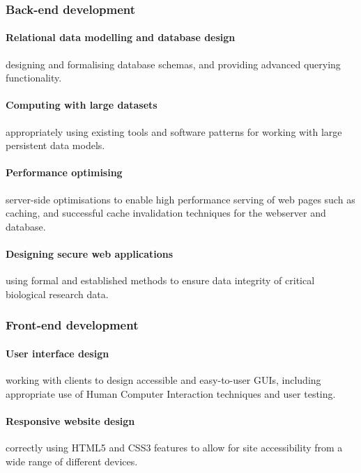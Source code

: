 \documentclass[12pt,a4paper]{article}
\begin{document}
\subsubsection{Back-end development}

\paragraph{Relational data modelling and database design} designing and
formalising database schemas, and providing advanced querying functionality.

\paragraph{Computing with large datasets} appropriately using existing tools and
software patterns for working with large persistent data models.

\paragraph{Performance optimising} server-side optimisations to enable high
performance serving of web pages such as caching, and successful cache
invalidation techniques for the webserver and database.

\paragraph{Designing secure web applications} using formal and established
methods to ensure data integrity of critical biological research data.

\subsubsection{Front-end development}

\paragraph{User interface design} working with clients to design accessible and
easy-to-user GUIs, including appropriate use of Human Computer Interaction
techniques and user testing.

\paragraph{Responsive website design} correctly using HTML5 and CSS3 features to
allow for site accessibility from a wide range of different devices.
\end{document}
